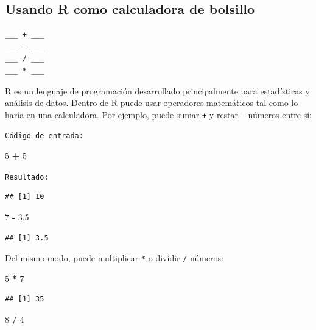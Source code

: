 \documentclass[
]{book}
\newenvironment{Shaded}{\begin{snugshade}}{\end{snugshade}}
\newcommand{\DecValTok}[1]{\textcolor[rgb]{0.00,0.00,0.81}{#1}}
\newcommand{\FloatTok}[1]{\textcolor[rgb]{0.00,0.00,0.81}{#1}}
\newcommand{\OperatorTok}[1]{\textcolor[rgb]{0.81,0.36,0.00}{\textbf{#1}}}
\newcommand{\StringTok}[1]{\textcolor[rgb]{0.31,0.60,0.02}{#1}}
\begin{document}
\hypertarget{usando-r-como-calculadora-de-bolsillo}{%
\subsection{Usando R como calculadora de bolsillo}\label{usando-r-como-calculadora-de-bolsillo}}

\begin{verbatim}
___ + ___
___ - ___
___ / ___
___ * ___
\end{verbatim}

R es un lenguaje de programación desarrollado principalmente para estadísticas y análisis de datos. Dentro de R puede usar operadores matemáticos tal como lo haría en una calculadora. Por ejemplo, puede sumar \texttt{+} y restar \texttt{-} números entre sí:

\texttt{Código\ de\ entrada:}

\begin{Shaded}
\begin{Highlighting}[]
\DecValTok{5} \OperatorTok{+}\StringTok{ }\DecValTok{5}
\end{Highlighting}
\end{Shaded}

\texttt{Resultado:}

\begin{verbatim}
## [1] 10
\end{verbatim}

\begin{Shaded}
\begin{Highlighting}[]
\DecValTok{7} \OperatorTok{-}\StringTok{ }\FloatTok{3.5}
\end{Highlighting}
\end{Shaded}

\begin{verbatim}
## [1] 3.5
\end{verbatim}

Del mismo modo, puede multiplicar \texttt{*} o dividir \texttt{/} números:

\begin{Shaded}
\begin{Highlighting}[]
\DecValTok{5} \OperatorTok{*}\StringTok{ }\DecValTok{7}   
\end{Highlighting}
\end{Shaded}

\begin{verbatim}
## [1] 35
\end{verbatim}

\begin{Shaded}
\begin{Highlighting}[]
\DecValTok{8} \OperatorTok{/}\StringTok{ }\DecValTok{4}   
\end{Highlighting}
\end{Shaded}
\end{document}
